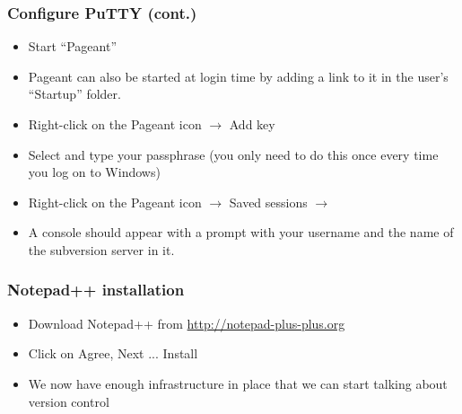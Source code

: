 \begin{frame}[fragile]
    \frametitle{Configure PuTTY (cont.)}
    \windowsframe

    \begin{itemize}
        \item Start \enquote{Pageant}
        \item Pageant can also be started at login time by adding a link to
            it in the user's \enquote{Startup} folder.
        \item Right-click on the Pageant icon $\rightarrow$ Add key
        \item Select  and type your passphrase (you only need
            to do this once every time you log on to Windows)
        \item Right-click on the Pageant icon $\rightarrow$ Saved sessions
            $\rightarrow$ 
        \item A console should appear with a prompt with your username and
            the name of the subversion server in it.
    \end{itemize}
\end{frame}

\begin{frame}
    \frametitle{Notepad++ installation}
    \windowsframe
    \begin{itemize}
	\item Download Notepad++ from \url{http://notepad-plus-plus.org}
	\item Click on Agree, Next ... Install
    \end{itemize}

    \begin{itemize}
        \item We now have enough infrastructure in place that we can start
            talking about version control
    \end{itemize}
\end{frame}

